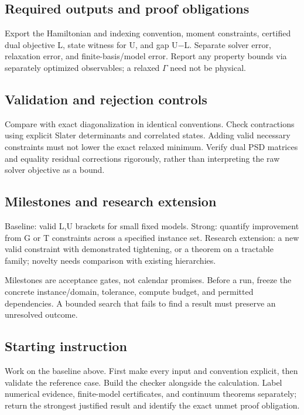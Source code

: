 \documentclass[
  11pt,
]{article}
\begin{document}
\subsection{Required outputs and proof obligations}

Export the Hamiltonian and indexing convention, moment constraints,
certified dual objective L, state witness for U, and gap
U\ensuremath{-}L. Separate solver error, relaxation error, and
finite-basis/model error. Report any property bounds via separately
optimized observables; a relaxed \ensuremath{\Gamma} need not be
physical.

\subsection{Validation and rejection controls}

Compare with exact diagonalization in identical conventions. Check
contractions using explicit Slater determinants and correlated states.
Adding valid necessary constraints must not lower the exact relaxed
minimum. Verify dual PSD matrices and equality residual corrections
rigorously, rather than interpreting the raw solver objective as a
bound.

\subsection{Milestones and research extension}

Baseline: valid L,U brackets for small fixed models. Strong: quantify
improvement from G or T constraints across a specified instance set.
Research extension: a new valid constraint with demonstrated tightening,
or a theorem on a tractable family; novelty needs comparison with
existing hierarchies.

Milestones are acceptance gates, not calendar promises. Before a run,
freeze the concrete instance/domain, tolerance, compute budget, and
permitted dependencies. A bounded search that fails to find a result
must preserve an unresolved outcome.

\subsection{Starting instruction}

Work on the baseline above. First make every input and convention
explicit, then validate the reference case. Build the checker alongside
the calculation. Label numerical evidence, finite-model certificates,
and continuum theorems separately; return the strongest justified result
and identify the exact unmet proof obligation.
\end{document}
